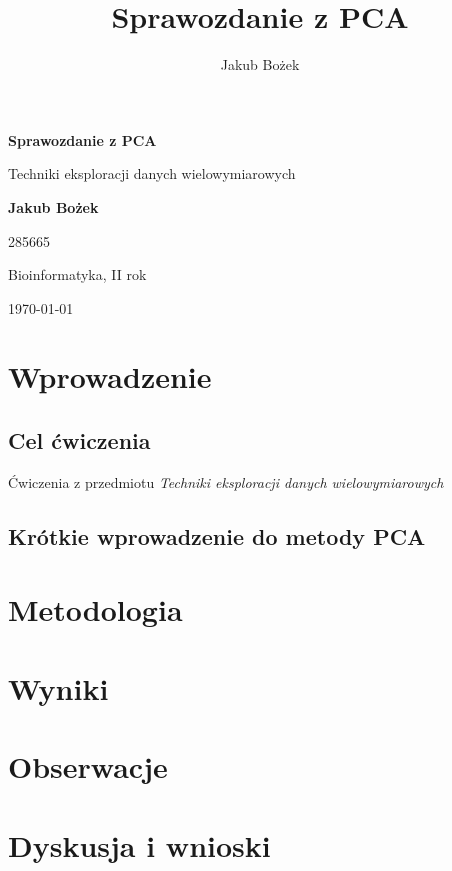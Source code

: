 \documentclass[12pt, a4paper]{article}
\author{Jakub Bożek}
\title{Sprawozdanie z PCA}
\begin{document}
\begin{titlepage}
    \centering
    {\LARGE \bfseries Sprawozdanie z PCA \par}
    \vspace{1cm}
    
    {\Large Techniki eksploracji danych wielowymiarowych \par}
    \vspace{2cm}
    
    {\LARGE \bfseries Jakub Bożek \par}
    \vspace{0.5cm}
    
    {\large 285665 \par}
    \vspace{0.5cm}
    
    {\large Bioinformatyka, II rok \par}
    \vspace{2cm}
    
    {\Large \today \par}
    
    \newpage
    \thispagestyle{empty}

    \tableofcontents
\end{titlepage}

\section{Wprowadzenie}

    \subsection{Cel ćwiczenia}

    Ćwiczenia z przedmiotu \it{Techniki eksploracji danych wielowymiarowych}

    \subsection{Krótkie wprowadzenie do metody PCA}

\section{Metodologia}

\section{Wyniki}

\section{Obserwacje}

\section{Dyskusja i wnioski}
\end{document}
